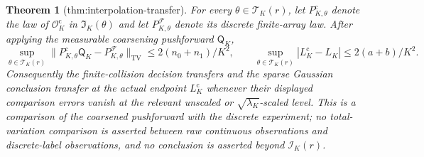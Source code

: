 \documentclass{article}
\newtheorem{theorem}{Theorem}
\begin{document}
\begin{theorem}[thm:interpolation-transfer]\label{thm:interpolation-transfer}
For every \(\theta\in\mathcal T_K(r)\), let \(P^{\mathrm c}_{K,\theta}\) denote the law of \(\mathcal O_K^{\mathrm c}\) in \(\mathfrak I_K(\theta)\) and let \(P^{\mathcal F}_{K,\theta}\) denote its discrete finite-array law. After applying the measurable coarsening pushforward \(\mathsf Q_K\), \[\sup_{\theta\in\mathcal T_K(r)}\lVert P^{\mathrm c}_{K,\theta}\mathsf Q_K-P^{\mathcal F}_{K,\theta}\rVert_{\mathrm{TV}}\le 2(n_0+n_1)/K^2,\qquad \sup_{\theta\in\mathcal T_K(r)}|L_K^{\mathrm c}-L_K|\le2(a+b)/K^2.\] Consequently the finite-collision decision transfers and the sparse Gaussian conclusion transfer at the actual endpoint \(L_K^{\mathrm c}\) whenever their displayed comparison errors vanish at the relevant unscaled or \(\sqrt{\lambda_K}\)-scaled level. This is a comparison of the coarsened pushforward with the discrete experiment; no total-variation comparison is asserted between raw continuous observations and discrete-label observations, and no conclusion is asserted beyond \(\mathcal I_K(r)\).
\end{theorem}
\end{document}
